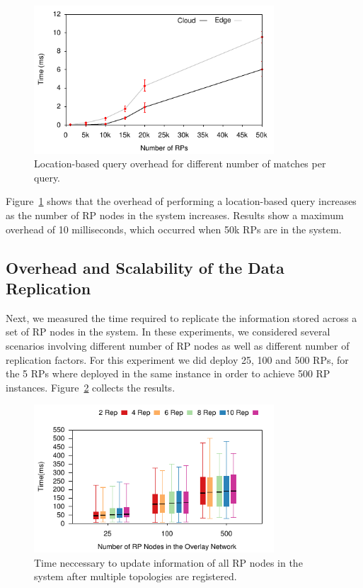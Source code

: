\begin{figure}[htb!]
  \centering
    \includegraphics[width=0.8\textwidth]{Figures/OSLocation.pdf}
  \caption{Location-based query overhead for different number of matches per query.} \label{fig:oslocation}
\end{figure}

Figure~\ref{fig:oslocation} shows that the overhead of performing a location-based query increases as the number of RP nodes in the system increases. Results show a maximum overhead of 10 milliseconds, which occurred when 50k RPs are in the system. 

\subsection{Overhead and Scalability of the Data Replication}

Next, we measured the time required to replicate the information stored across a set of RP nodes in the system. In these experiments, we considered several scenarios involving different number of RP nodes as well as different number of replication factors. For this experiment we did deploy 25, 100 and 500 RPs, for the 5 RPs where deployed in the same instance in order to achieve 500 RP instances. Figure~\ref{fig:topology} collects the results. 

\begin{figure}[htb!]
  \centering
    \includegraphics[width=0.8\textwidth]{Results/ReplicationOver.pdf}
  \caption{Time neccessary to update information of all RP nodes in the system after multiple topologies are registered.} \label{fig:topology}
    \vspace{-2ex}
\end{figure}

